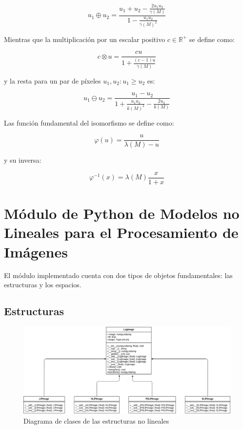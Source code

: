 \begin{equation}
	u_1\oplus u_2=\frac{u_1+u_2-\frac{2u_1u_2}{\gamma(M)}}{1-\frac{u_1u_2}{\gamma(M)^2}}
\end{equation}

Mientras que la multiplicaci\'on por un escalar positivo $c\in\mathbb{R}^+$ se define como:

\begin{equation}
	c\otimes u=\frac{cu}{1+\frac{(c-1)u}{\gamma(M)}}
\end{equation}

y la resta para un par de p\'ixeles $u_1,u_2:u_1\geq u_2$ es:

\begin{equation}
	u_1\ominus u_2=\frac{u_1-u_2}{1+\frac{u_1u_2}{k(M)^2}-\frac{2u_2}{k(M)}}
\end{equation}

Las funci\'on fundamental del isomorfismo se define como:

\begin{equation}
	\varphi(u)=\frac{u}{\lambda(M)-u}
\end{equation}

y su inversa:

\begin{equation}
	\varphi^{-1}(x)=\lambda(M)\frac{x}{1+x}
\end{equation}

\section{M\'odulo de Python de Modelos no Lineales para el Procesamiento de Im\'agenes}

El m\'odulo implementado cuenta con dos tipos de objetos fundamentales: las estructuras y los espacios.

\subsection{Estructuras}

\begin{figure}
	\begin{center}
		\includegraphics[width=16.0 cm]{images/structures_class_diagram.png}
		\caption{Diagrama de clases de las estructuras no lineales}
	\end{center}
\end{figure}

